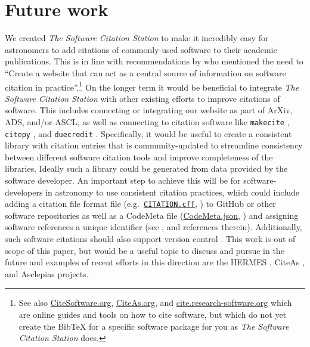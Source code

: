 \documentclass[twocolumn,linenumbers]{aastex631}
\newcommand{\site}{\textit{The Software Citation Station}\xspace}
\begin{document}

\section{Future work}
%
We created \site to make it incredibly easy for astronomers to add citations of commonly-used software to their academic publications. This is in line with recommendations by \citet{Bouquin:2023} who mentioned the need to ``Create a website that can act as a central source of information on software citation in practice''.\footnote{See also \href{CiteSoftware.org}{CiteSoftware.org}, \href{https://citeas.org/}{CiteAs.org}, and \href{https://cite.research-software.org/}{cite.research-software.org} which are online guides and tools on how to cite software, but which do not yet create the BibTeX for a specific software package for you as \site does.}
On the longer term it would be beneficial to integrate \site with other existing efforts to improve citations of software. 
This includes connecting or integrating our website as part of ArXiv, ADS, and/or ASCL, as well as connecting to citation software like \texttt{makecite} \citep{adrian_price_whelan_2019_3533303}, {\texttt{citepy}} \citep{citepy_software}, and \texttt{duecredit} \citep{duecredit}. 
Specifically, it would be useful to create a consistent library with citation entries that is community-updated to streamline consistency between different software citation tools and improve completeness of the libraries. Ideally such a library could be generated from data provided by the software developer.  
An important step to achieve this will be for software-developers in astronomy to use consistent citation practices, which could include adding a citation file format file (e.g.\ \href{https://citation-file-format.github.io/}{\texttt{CITATION.cff}}, \citealt[][]{citation-cff}) to GitHub or other software repositories as well as a CodeMeta file (\href{https://codemeta.github.io/}{CodeMeta.json}, \citealt[][]{jones2017codemeta}) and assigning software references a unique identifier (see \citealt[][]{Katz:2014, Cosmo:2020}, and references therein). Additionally, such software citations should also support version control \citep[e.g.][]{Chen:2020}. This work is out of scope of this paper, but would be a useful topic to discuss and pursue in the future \citep[cf.][]{katz:2018software, Katz:2019, katz2020recognizing, vandeSandt:2019, Cosmo:2020, 2021arXiv211114278A, Druskat:2022, Bouquin:2023} and examples of recent efforts in this direction are the HERMES  \citep{Druskat:2022}, CiteAs \citep{CiteAs2021}, and Asclepias \citep[][]{Henneken2022Asclepias} projects. %
\end{document}
